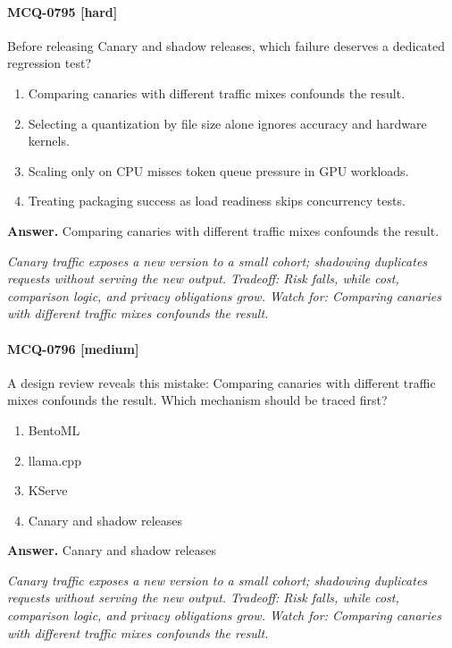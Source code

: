 \paragraph{MCQ-0795 [hard]} Before releasing Canary and shadow releases, which failure deserves a dedicated regression test?
\begin{enumerate}[label=\Alph*.]
\item Comparing canaries with different traffic mixes confounds the result.
\item Selecting a quantization by file size alone ignores accuracy and hardware kernels.
\item Scaling only on CPU misses token queue pressure in GPU workloads.
\item Treating packaging success as load readiness skips concurrency tests.
\end{enumerate}
\noindent\textbf{Answer.} Comparing canaries with different traffic mixes confounds the result.
\par\textit{Canary traffic exposes a new version to a small cohort; shadowing duplicates requests without serving the new output. Tradeoff: Risk falls, while cost, comparison logic, and privacy obligations grow. Watch for: Comparing canaries with different traffic mixes confounds the result.}
\paragraph{MCQ-0796 [medium]} A design review reveals this mistake: Comparing canaries with different traffic mixes confounds the result. Which mechanism should be traced first?
\begin{enumerate}[label=\Alph*.]
\item BentoML
\item llama.cpp
\item KServe
\item Canary and shadow releases
\end{enumerate}
\noindent\textbf{Answer.} Canary and shadow releases
\par\textit{Canary traffic exposes a new version to a small cohort; shadowing duplicates requests without serving the new output. Tradeoff: Risk falls, while cost, comparison logic, and privacy obligations grow. Watch for: Comparing canaries with different traffic mixes confounds the result.}
